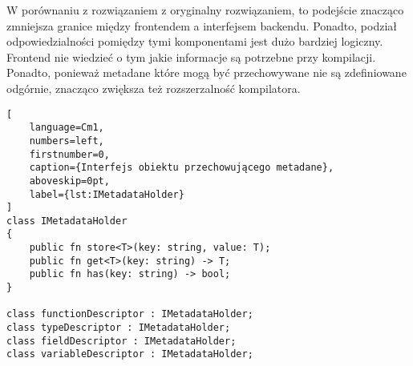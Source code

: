 W porównaniu z rozwiązaniem z oryginalny rozwiązaniem, to podejście znacząco zmniejsza granice między frontendem a interfejsem backendu.
Ponadto, podział odpowiedzialności pomiędzy tymi komponentami jest dużo bardziej logiczny.
Frontend nie wiedzieć o tym jakie informacje są potrzebne przy kompilacji.
Ponadto, ponieważ metadane które mogą być przechowywane nie są zdefiniowane odgórnie, znacząco zwiększa też rozszerzalność kompilatora.

\begin{lstlisting}[
    language=Cm1,
    numbers=left,
    firstnumber=0,
    caption={Interfejs obiektu przechowującego metadane},
    aboveskip=0pt,
    label={lst:IMetadataHolder}
]
class IMetadataHolder
{
    public fn store<T>(key: string, value: T);
    public fn get<T>(key: string) -> T;
    public fn has(key: string) -> bool;
}

class functionDescriptor : IMetadataHolder;
class typeDescriptor : IMetadataHolder;
class fieldDescriptor : IMetadataHolder;
class variableDescriptor : IMetadataHolder;
\end{lstlisting}
